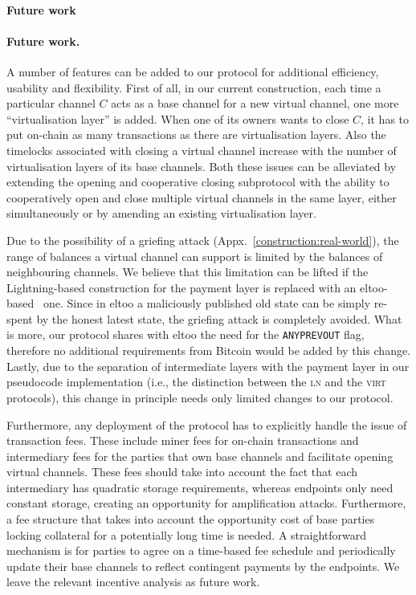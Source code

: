 \makeatletter%
%
  {\paragraph{Future work}}%
  {\paragraph{Future work.}}%
\makeatother%
  A number of features can be added to our protocol for additional efficiency,
  usability and flexibility. First of all, in our current construction, each
  time a particular channel $C$ acts as a base
  channel for a new virtual channel, one more ``virtualisation layer'' is added. When
  one of its owners wants to close $C$, it has to put on-chain as many
  transactions as there are virtualisation layers. Also the timelocks associated
  with closing a virtual channel increase with the number of virtualisation
  layers of its base channels. Both these issues can be alleviated by extending
  the opening and cooperative closing subprotocol with the ability to
  cooperatively open and close multiple virtual channels in the same layer,
  either simultaneously or by amending an existing virtualisation layer.

  Due to the possibility of a griefing attack
  (Appx.~\ref{construction:real-world}), the range of balances a virtual
  channel can
  support is limited by the balances of neighbouring channels. We believe that
  this limitation can be lifted if the Lightning-based
  construction for the payment layer is replaced with an
  eltoo-based~\cite{eltoo} one. Since in eltoo a maliciously published
  old state can be simply re-spent by the honest latest state, the griefing
  attack is completely avoided. What is more, our protocol shares with eltoo the
  need for the \texttt{ANYPREVOUT} flag, therefore no additional
  requirements from Bitcoin would be added by this change. Lastly,
  due to the separation of intermediate layers with the payment layer in our
  pseudocode implementation (i.e., the distinction
  between the \textsc{ln} and the \textsc{virt} protocols), this change
  in principle needs only limited changes to our protocol.

  Furthermore, any deployment of the protocol has to explicitly handle the issue
  of transaction fees. These include miner fees for on-chain transactions and
  intermediary fees for the parties that own base channels and facilitate
  opening virtual channels. These fees should take into account the fact that
  each intermediary has quadratic storage requirements, whereas endpoints only
  need constant storage, creating an opportunity for amplification attacks.
  Furthermore, a fee structure that takes into account the opportunity cost of
  base parties locking collateral for a potentially long time is needed. A
  straightforward mechanism is for parties to agree on a time-based fee schedule
  and periodically update their base channels to reflect contingent payments by
  the endpoints. We leave the relevant incentive analysis as future work.

